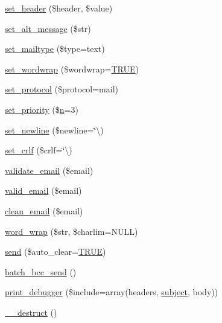 \begin{DoxyCompactItemize}
\mbox{\hyperlink{class_c_i___email_aff40701d50f18c87942be79f8b447247}{set\+\_\+header}} (\$header, \$value)
\item 
\mbox{\hyperlink{class_c_i___email_a18f0b650e6e9a859e1936a41e86fb3a6}{set\+\_\+alt\+\_\+message}} (\$str)
\item 
\mbox{\hyperlink{class_c_i___email_a9baeadff990ea673d75c3019c8cc3524}{set\+\_\+mailtype}} (\$type=\textquotesingle{}text\textquotesingle{})
\item 
\mbox{\hyperlink{class_c_i___email_a6abb8d5f17213eba1e243ca633da8084}{set\+\_\+wordwrap}} (\$wordwrap=\mbox{\hyperlink{constants_8php_ae04a3efe6aa42044f803ee90c2277846}{T\+R\+UE}})
\item 
\mbox{\hyperlink{class_c_i___email_a7be40507898a21ce9172b225e973b107}{set\+\_\+protocol}} (\$protocol=\textquotesingle{}mail\textquotesingle{})
\item 
\mbox{\hyperlink{class_c_i___email_aee3ae37c0bf5f8aca34f6e872efd66b8}{set\+\_\+priority}} (\$\mbox{\hyperlink{cli_2error__php_8php_a2e6b16bbc42094e4c51ade3c10afdcf1}{n}}=3)
\item 
\mbox{\hyperlink{class_c_i___email_aa8661a0f33afb4df33d4f6f935b36a49}{set\+\_\+newline}} (\$newline=\char`\"{}\textbackslash{})
\item 
\mbox{\hyperlink{class_c_i___email_a85c81ed9eb7f4af42e69a07c6c6805d0}{set\+\_\+crlf}} (\$crlf=\char`\"{}\textbackslash{})
\item 
\mbox{\hyperlink{class_c_i___email_a1907f0dba44e2968b8260dbc5770550f}{validate\+\_\+email}} (\$email)
\item 
\mbox{\hyperlink{class_c_i___email_abe07a23d74d453da8fb639b5c3951873}{valid\+\_\+email}} (\$email)
\item 
\mbox{\hyperlink{class_c_i___email_ab8139994bc1b1bee3d2750b627cdd0c6}{clean\+\_\+email}} (\$email)
\item 
\mbox{\hyperlink{class_c_i___email_aa3a2a5440115b320a0c2fcea542e546a}{word\+\_\+wrap}} (\$str, \$charlim=N\+U\+LL)
\item 
\mbox{\hyperlink{class_c_i___email_a547a65a81ba2d1f98cc15121a45dab11}{send}} (\$auto\+\_\+clear=\mbox{\hyperlink{constants_8php_ae04a3efe6aa42044f803ee90c2277846}{T\+R\+UE}})
\item 
\mbox{\hyperlink{class_c_i___email_a889f14cabfcfe05b5c0d0dbbb8f557e0}{batch\+\_\+bcc\+\_\+send}} ()
\item 
\mbox{\hyperlink{class_c_i___email_a11f22e40cb1409ee7569c0abc15fae09}{print\+\_\+debugger}} (\$include=array(\textquotesingle{}headers\textquotesingle{}, \textquotesingle{}\mbox{\hyperlink{class_c_i___email_aaa61b3aaa6cc4c90e26686e4bf41587a}{subject}}\textquotesingle{}, \textquotesingle{}body\textquotesingle{}))
\item 
\mbox{\hyperlink{class_c_i___email_a421831a265621325e1fdd19aace0c758}{\+\_\+\+\_\+destruct}} ()
\end{DoxyCompactItemize}
